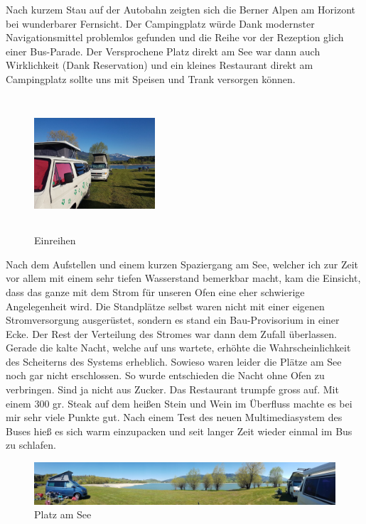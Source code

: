 Nach kurzem Stau auf der Autobahn zeigten sich die Berner Alpen am Horizont bei wunderbarer Fernsicht.
Der Campingplatz würde Dank modernster Navigationsmittel problemlos gefunden und die Reihe vor der Rezeption glich einer Bus-Parade.
Der Versprochene Platz direkt am See war dann auch Wirklichkeit (Dank Reservation) und ein kleines Restaurant direkt am Campingplatz sollte uns mit Speisen und Trank versorgen können.

\begin{figure} 
  \begin{centering}
    \includegraphics[width=0.4\textwidth, height=5cm, keepaspectratio]{../Bilder/Gruyere/5.jpg}
    \caption{Einreihen}
  \end{centering}
\end{figure} 

Nach dem Aufstellen und einem kurzen Spaziergang am See, welcher ich zur Zeit vor allem mit einem sehr tiefen Wasserstand bemerkbar macht, kam die Einsicht, dass das ganze mit dem Strom für unseren Ofen eine eher schwierige Angelegenheit wird.
Die Standplätze selbst waren nicht mit einer eigenen Stromversorgung ausgerüstet, sondern es stand ein Bau-Provisorium in einer Ecke.
Der Rest der Verteilung des Stromes war dann dem Zufall überlassen.
Gerade die kalte Nacht, welche auf uns wartete, erhöhte die Wahrscheinlichkeit des Scheiterns des Systems erheblich.
Sowieso waren leider die Plätze am See noch gar nicht erschlossen.
So wurde entschieden die Nacht ohne Ofen zu verbringen.
Sind ja nicht aus Zucker.
Das Restaurant trumpfe gross auf.
Mit einem 300 gr. Steak auf dem heißen Stein und Wein im Überfluss machte es bei mir sehr viele Punkte gut.
Nach einem Test des neuen Multimediasystem des Buses hieß es sich warm einzupacken und seit langer Zeit wieder einmal im Bus zu schlafen.

\begin{figure}[hb]
    \centering
    \includegraphics[width=\textwidth]{../Bilder/Gruyere/3.jpg}
    \caption{Platz am See}
    \label{img:Gruyere}
\end{figure}

